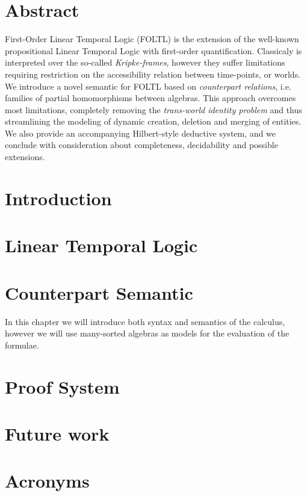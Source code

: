 \documentclass[a4paper,11pt]{report}
\begin{document}
\chapter*{Abstract}
First-Order Linear Temporal Logic (FOLTL) is the extension of the well-known propositional Linear Temporal Logic with
first-order quantification. Classicaly is interpreted over the so-called \emph{Kripke-frames}, however they suffer
limitations requiring restriction on the accessibility relation between time-points, or worlds. We introduce a novel
semantic for FOLTL based on \emph{counterpart relations}, i.e. families of partial homomorphisms between algebras. This
approach overcomes most limitations, completely removing the \emph{trans-world identity problem} and thus streamlining
the modeling of dynamic creation, deletion and merging of entities. We also provide an accompanying Hilbert-style
deductive system, and we conclude with consideration about completeness, decidability and possible extensions.

\chapter{Introduction}\label{chap:intro}


\chapter{Linear Temporal Logic}\label{chap:ltl}


\chapter{Counterpart Semantic}\label{chap:counterpart}
In this chapter we will introduce both syntax and semantics of the calculus, however we will use many-sorted algebras as
models for the evaluation of the formulae.





\chapter{Proof System}\label{chap:system}


\chapter{Future work}\label{chap:future}


\chapter*{Acronyms}
\begin{acronym}
\end{acronym}
\end{document}

